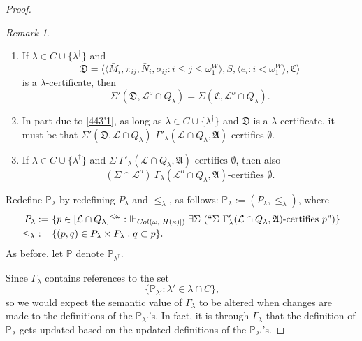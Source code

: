 \documentclass[12pt, twoside]{memoir}
\numberwithin{equation}{section}
\theoremstyle{definition}
\theoremstyle{remark}
\newtheorem{rem}[thm]{Remark}
\theoremstyle{definition}
\theoremstyle{definition}
\theoremstyle{definition}
\theoremstyle{remark}
\begin{document}
\begin{proof}
\begin{rem}\label{rem443}
\leavevmode
\begin{enumerate}[label=(\arabic*)]
    \item\label{443'1} If $\lambda \in C \cup \{\lambda^{\dagger}\}$ and
    \begin{equation*}
        \mathfrak{D} = \langle \langle \bar{M}_i, \pi_{ij},  \bar{N}_i, \sigma_{ij} : i \leq j \leq \omega_1^{W} \rangle, S, \langle e_i : i < \omega_1^W \rangle, \mathfrak{C} \rangle
    \end{equation*}
    is a $\lambda$-certificate, then
    \begin{equation*}
        \Sigma'(\mathfrak{D}, \mathcal{L}^o \cap Q_{\lambda}) = \Sigma(\mathfrak{C}, \mathcal{L}^o \cap Q_{\lambda}) \text{.}
    \end{equation*}
    \item\label{443'2} In part due to \ref{443'1}, as long as $\lambda \in C \cup \{\lambda^{\dagger}\}$ and $\mathfrak{D}$ is a $\lambda$-certificate, it must be that $\Sigma'(\mathfrak{D}, \mathcal{L} \cap Q_{\lambda})$ $\Gamma'_{\lambda} (\mathcal{L} \cap Q_{\lambda}, \mathfrak{A})$-certifies $\emptyset$.
    \item\label{443'3} If $\lambda \in C \cup \{\lambda^{\dagger}\}$ and $\Sigma \ \Gamma'_{\lambda} (\mathcal{L} \cap Q_{\lambda}, \mathfrak{A}) \text{-certifies } \emptyset$, then also
    \begin{equation*}
        (\Sigma \cap \mathcal{L}^o) \ \Gamma_{\lambda} (\mathcal{L}^o \cap Q_{\lambda}, \mathfrak{A}) \text{-certifies } \emptyset \text{.}
    \end{equation*}
\end{enumerate}
\end{rem}

Redefine $\mathbb{P}_{\lambda}$ by redefining $P_{\lambda}$ and $\leq_{\lambda}$, as follows: $\mathbb{P}_{\lambda} := (P_{\lambda}, \leq_{\lambda})$, where
\begin{align*}
    P_{\lambda} := \ & \{p \in [\mathcal{L} \cap Q_{\lambda}]^{< \omega} : \ \Vdash_{Col(\omega, |H(\kappa)|)} \exists \Sigma \ (``\Sigma \ \Gamma'_{\lambda} (\mathcal{L} \cap Q_{\lambda}, \mathfrak{A}) \text{-certifies } p")\} \\
    \leq_{\lambda} \ := \ & \{(p, q) \in P_{\lambda} \times P_{\lambda} : q \subset p\} \text{.}
\end{align*}
As before, let $\mathbb{P}$ denote $\mathbb{P}_{\lambda^{\dagger}}$. 

Since $\Gamma_{\lambda}$ contains references to the set 
\begin{equation*}
    \{\mathbb{P}_{\lambda'} : \lambda' \in \lambda \cap C\} \text{,}
\end{equation*}
so we would expect the semantic value of $\Gamma_{\lambda}$ to be altered when changes are made to the definitions of the $\mathbb{P}_{\lambda'}$'s. In fact, it is through $\Gamma_{\lambda}$ that the definition of $\mathbb{P}_{\lambda}$ gets updated based on the updated definitions of the $\mathbb{P}_{\lambda'}$'s.


\end{proof}
\end{document}
